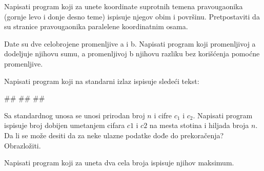 \begin{Exercise}[label=p1_13] 
Napisati program koji za unete koordinate suprotnih temena pravougaonika
 (gornje levo i donje desno teme) ispisuje njegov obim i površinu. Pretpostaviti da su stranice pravougaonika
paralelene koordinatnim osama.
\\
\end{Exercise}
\begin{Answer}[ref=p1_13]
\end{Answer}


\begin{Exercise}[label=p1_14]
Date su dve celobrojene promenljive a i b. Napisati program koji promenljivoj a dodeljuje
njihovu sumu, a promenljivoj b njihovu razliku bez korišćenja pomoćne
promenljive. \\
\end{Exercise}
\begin{Answer}[ref=p1_14]
\end{Answer}

\begin{Exercise}[label=p1_15]
Napisati program koji na standarni izlaz ispisuje sledeći tekst: \\
\begin{miditest}
\begin{upotreba}{1}
#\naslovInt#
##
##
\end{upotreba}
\end{miditest}
\end{Exercise}
\begin{Answer}[ref=p1_15]
\end{Answer}

\begin{Exercise}[label=p1_16]
Sa standardnog unosa se unosi prirodan broj $n$ i cifre $c_1$ i $c_2$. Napisati program ispisuje broj dobijen umetanjem cifara $c1$ i $c2$ na mesta stotina i hiljada broja $n$. 
Da li se može desiti da za neke ulazne podatke dođe do prekoračenja?
Obrazložiti. \\
\end{Exercise}
\begin{Answer}[ref=p1_16]
\end{Answer}

\begin{Exercise}[label=p1_17]
Napisati program koji za uneta dva cela broja ispisuje njihov maksimum. \\
\end{Exercise}
\begin{Answer}[ref=p1_17]
\end{Answer}

